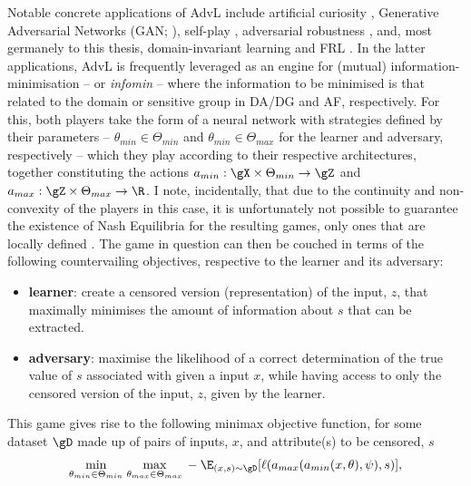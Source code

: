 Notable concrete applications of \ac{AdvL} include artificial curiosity
\citep{schmidhuber1992learning}, Generative Adversarial Networks (\ac{GAN};
\cite{goodfellow14generative}), self-play \citep{silver2018general}, adversarial robustness
\citep{szegedy2013intriguing}, and, most germanely to this thesis, domain-invariant learning
\citep{ganin2016domain, zhao2019learning} and \ac{FRL} \citep{edwards2015censoring,
madras2018learning}.
%
%
In the latter applications, \ac{AdvL} is frequently leveraged as an engine for
(mutual) information-minimisation -- or \emph{infomin} -- where the information to be minimised is that
related to the domain or sensitive group in \ac{DA}/\ac{DG} and \ac{AF}, respectively.
%
For this, both players take the form of a neural network with strategies defined by their
parameters -- \(\theta_{min} \in \Theta_{min}\) and \(\theta_{min} \in \Theta_{max}\) for the
learner and adversary, respectively -- which they play according to their respective architectures,
together constituting the actions \(a_{min}: \gX \times \Theta_{min} \to \gZ \) and \(a_{max}: \gZ
\times \Theta_{max} \to \R \).
%
I note, incidentally, that due to the continuity and non-convexity of the players in this case, it
is unfortunately not possible to guarantee the existence of Nash Equilibria for the resulting
games, only ones that are locally defined \citep{unterthiner2018coulomb}.
%
The game in question can then be couched in terms of the following countervailing objectives,
respective to the learner and its adversary:
%
\begin{itemize}
  \item 
    \textbf{learner}: create a censored version (representation) of the input, \(z\), that
    maximally minimises the amount of information about \(s\) that can be extracted.
  \item 
    \textbf{adversary}: maximise the likelihood of a correct determination of the true value of
    \(s\) associated with given a input \(x\), while having access to only the censored version of
    the input, \(z\), given by the learner.
\end{itemize}
%
This game gives rise to the following minimax objective function, for some dataset \(\gD\)
made up of pairs of inputs, \(x\), and attribute(s) to be censored, \(s\)
%
\begin{align}
  \underset{\theta_{min} \in \Theta_{min}}{\text{min}}\; \underset{\theta_{max} \in
  \Theta_{max}}{\text{max}}\,
%
-\E_{(x, s) \sim \gD} [ \ell(a_{max}( a_{min}(x, \theta), \psi ), s ) ],
%
\label{eq:adv-infomin}
\end{align}
